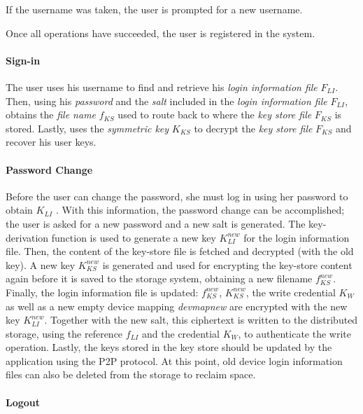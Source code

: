 If the username was taken,
the user is prompted for a new username.

Once all operations
have succeeded, the user is registered in the system.


\paragraph{Sign-in}
The user uses his username to find and retrieve his \textit{login information
file} $F_{LI}$. Then, using his \textit{password} and the \textit{salt} included in the
\textit{login information file} $F_{LI}$, obtains the \textit{file name}
$f_{KS}$ used to
route back to where the \textit{key store file} $F_{KS}$ is stored.  Lastly, uses the
\textit{symmetric key} $K_{KS}$ to decrypt the \textit{key store file}
$F_{KS}$ and recover his user keys.

\paragraph{Password Change}


Before the user can change the password, she must log in using her password to
obtain $K_{LI}$ . With this information, the password change can be
accomplished; the user is asked for a new password and a new salt is
generated. The key-derivation function is used to generate a new key
$K_{LI}^{new}$
for the login information file. Then, the content of the key-store file is
fetched and decrypted (with the old key). A new key $K_{KS}^{new}$ is generated and
used for encrypting the key-store content again before it is saved to the
storage system, obtaining a new filename $f_{KS}^{new}$.
Finally, the login information file
is updated: $f_{KS}^{new}$, $K_{KS}^{new}$, the write credential $K_{W}$ as well as a new empty
device mapping \textit{devmapnew} are encrypted with the new key $K_{LI}^{new}$.
  Together with the new salt, this ciphertext is written to the distributed
storage, using the reference $f_{LI}$ and the credential $K_W$, to authenticate the
write operation. Lastly, the keys stored in the key store should be updated by
the application using the P2P protocol.  At this point, old device login
information files can also be deleted from the
storage to reclaim space.

\paragraph{Logout}

